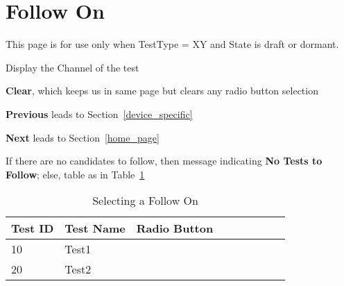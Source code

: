 \documentclass[letterpaper]{article}
\begin{document}
\section{Follow On}
\label{follow_on}
This page is for use only when TestType = XY and State is draft or dormant.
\be
\item Display the Channel of the test
\item {\bf Clear}, which keeps us in same page but clears any radio button
  selection
\item {\bf Previous} leads to Section~\ref{device_specific}
\item {\bf Next} leads to Section~\ref{home_page}
\item If there are no candidates to follow, then message indicating {\bf No
  Tests to Follow}; else, table as in Table~\ref{tbl_follow_on}
  \ee

\begin{table}[hb]
\centering
\begin{tabular}{|l||l|l|l|l|l|l|l|l|}  \hline \hline
  {\bf Test ID } & {\bf Test Name} & {\bf Radio Button}\\ \hline 
  10 & Test1 & \\ \hline
  20 & Test2 & \\ \hline
\hline
\end{tabular}
\caption{Selecting a Follow On}
\label{tbl_follow_on}
\end{table}
\end{document}
